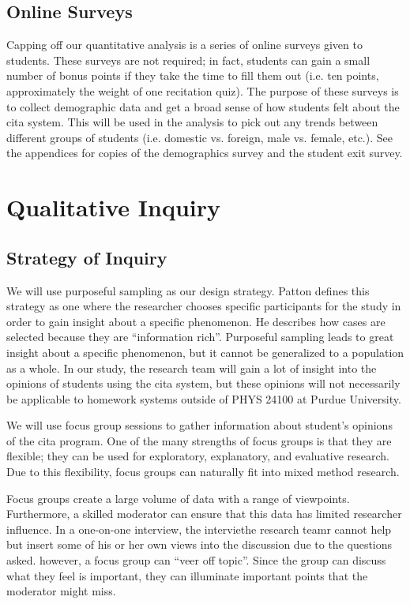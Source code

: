 \subsection{Online Surveys}

Capping off our quantitative analysis is a series of online surveys given to students. These surveys are not required; in fact, students can gain a small number of bonus points if they take the time to fill them out (i.e. ten points, approximately the weight of one recitation quiz). The purpose of these surveys is to collect demographic data and get a broad sense of how students felt about the \gls{cita} system. This will be used in the analysis to pick out any trends between different groups of students (i.e. domestic vs. foreign, male vs. female, etc.). See the appendices for copies of the demographics survey and the student exit survey.

\section{Qualitative Inquiry}

\subsection{Strategy of Inquiry}

We will use purposeful sampling as our design strategy. Patton defines this strategy as one where the researcher chooses specific participants for the study in order to gain insight about a specific phenomenon. He describes how cases are selected because they are ``information rich''. Purposeful sampling leads to great insight about a specific phenomenon, but it cannot be generalized to a population as a whole\cite{patton2015}. In our study, the research team will gain a lot of insight into the opinions of students using the \gls{cita} system, but these opinions will not necessarily be applicable to homework systems outside of PHYS 24100 at Purdue University.

We will use focus group sessions to gather information about student's opinions of the \gls{cita} program. One of the many strengths of focus groups is that they are flexible; they can be used for exploratory, explanatory, and evaluative research. Due to this flexibility, focus groups can naturally fit into mixed method research.

Focus groups create a large volume of data with a range of viewpoints. Furthermore, a skilled moderator can ensure that this data has limited researcher influence. In a one-on-one interview, the interviethe research teamr cannot help but insert some of his or her own views into the discussion due to the questions asked. however, a focus group can “veer off topic”. Since the group can discuss what they feel is important, they can illuminate important points that the moderator might miss.

